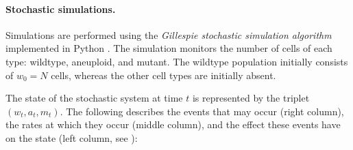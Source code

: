 \documentclass[12pt]{extarticle}
\begin{document}

\paragraph{Stochastic simulations.} 
Simulations are performed using the \emph{Gillespie stochastic simulation algorithm} \citep{gillespie1976general,gillespie1977exact} implemented in Python \citep{python}.
The simulation monitors the number of cells of each type: wildtype, aneuploid, and mutant. 
The wildtype population initially consists of $w_0=N$ cells, whereas the other cell types are initially absent.

The state of the stochastic system at time $t$ is represented by the triplet $\left(w_t,a_t,m_t\right)$. The following describes the events that may occur (right column), the rates at which they occur (middle column), and the effect these events have on the state (left column, see ):
\end{document}
